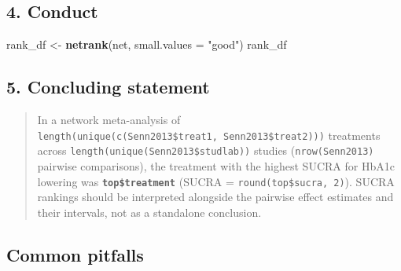 \documentclass[
]{article}
\newenvironment{Shaded}{\begin{snugshade}}{\end{snugshade}}
\newcommand{\AttributeTok}[1]{\textcolor[rgb]{0.13,0.29,0.53}{#1}}
\newcommand{\DecValTok}[1]{\textcolor[rgb]{0.00,0.00,0.81}{#1}}
\newcommand{\FunctionTok}[1]{\textcolor[rgb]{0.13,0.29,0.53}{\textbf{#1}}}
\newcommand{\NormalTok}[1]{#1}
\newcommand{\OtherTok}[1]{\textcolor[rgb]{0.56,0.35,0.01}{#1}}
\newcommand{\SpecialCharTok}[1]{\textcolor[rgb]{0.81,0.36,0.00}{\textbf{#1}}}
\newcommand{\StringTok}[1]{\textcolor[rgb]{0.31,0.60,0.02}{#1}}
\begin{document}
\subsection{4. Conduct}\label{conduct}

\begin{Shaded}
\begin{Highlighting}[]
\NormalTok{rank\_df }\OtherTok{\textless{}{-}} \FunctionTok{netrank}\NormalTok{(net, }\AttributeTok{small.values =} \StringTok{"good"}\NormalTok{)}
\NormalTok{rank\_df}
\end{Highlighting}
\end{Shaded}

\subsection{5. Concluding statement}\label{concluding-statement}

\begin{Shaded}
\end{Shaded}

\begin{quote}
In a network meta-analysis of
\texttt{length(unique(c(Senn2013\$treat1,\ Senn2013\$treat2)))}
treatments across \texttt{length(unique(Senn2013\$studlab))} studies
(\texttt{nrow(Senn2013)} pairwise comparisons), the treatment with the
highest SUCRA for HbA1c lowering was \textbf{\texttt{top\$treatment}}
(SUCRA = \texttt{round(top\$sucra,\ 2)}). SUCRA rankings should be
interpreted alongside the pairwise effect estimates and their intervals,
not as a standalone conclusion.
\end{quote}

\subsection{Common pitfalls}\label{common-pitfalls}
\end{document}
